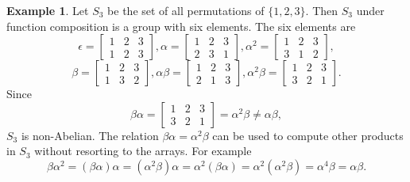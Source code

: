 \documentclass{article}
\theoremstyle{definition}
\newtheorem{example}{Example}[section]
\begin{document}
\begin{example}
    Let $S_3$ be the set of all permutations of $\{1,2,3\}$. Then $S_3$ under function composition is a group with six elements. The six elements are
    \begin{equation*}
        \epsilon = 
        \begin{bmatrix}
            1 & 2 & 3 \\
            1 & 2 & 3
        \end{bmatrix},
        \alpha = 
        \begin{bmatrix}
            1 & 2 & 3 \\
            2 & 3 & 1
        \end{bmatrix},
        \alpha^2 = 
        \begin{bmatrix}
            1 & 2 & 3 \\
            3 & 1 & 2
        \end{bmatrix},
    \end{equation*}
    \begin{equation*}
        \beta = 
        \begin{bmatrix}
            1 & 2 & 3 \\
            1 & 3 & 2
        \end{bmatrix},
        \alpha\beta = 
        \begin{bmatrix}
            1 & 2 & 3 \\
            2 & 1 & 3
        \end{bmatrix},
        \alpha^2\beta = 
        \begin{bmatrix}
            1 & 2 & 3 \\
            3 & 2 & 1
        \end{bmatrix}.
    \end{equation*}
    Since
    \begin{equation*}
        \beta\alpha =
        \begin{bmatrix}
            1 & 2 & 3 \\
            3 & 2 & 1
        \end{bmatrix}
        = \alpha^2\beta \neq \alpha\beta,
    \end{equation*}
    $S_3$ is non-Abelian. The relation $\beta\alpha = \alpha^2\beta$ can be used to compute other products in $S_3$ without resorting to the arrays. For example
    \begin{equation*}
        \beta\alpha^2 = (\beta\alpha)\alpha = (\alpha^2\beta)\alpha = \alpha^2(\beta\alpha) = \alpha^2(\alpha^2\beta) = \alpha^4\beta = \alpha\beta.
    \end{equation*}
\end{example}
 
\end{document}
